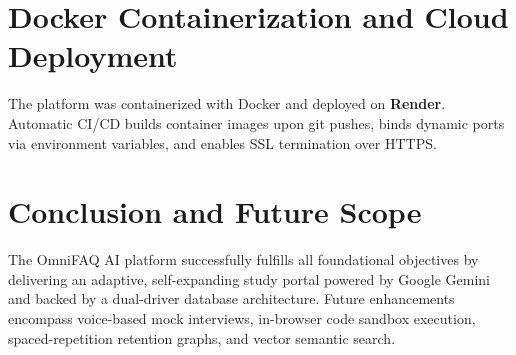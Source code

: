 \documentclass[12pt,a4paper]{report}
\begin{document}
\section{Docker Containerization and Cloud Deployment}
The platform was containerized with Docker and deployed on \textbf{Render}. Automatic CI/CD builds container images upon git pushes, binds dynamic ports via environment variables, and enables SSL termination over HTTPS.

\section{Conclusion and Future Scope}
The OmniFAQ AI platform successfully fulfills all foundational objectives by delivering an adaptive, self-expanding study portal powered by Google Gemini and backed by a dual-driver database architecture. Future enhancements encompass voice-based mock interviews, in-browser code sandbox execution, spaced-repetition retention graphs, and vector semantic search.

\renewcommand{\bibname}{References}
\end{document}
